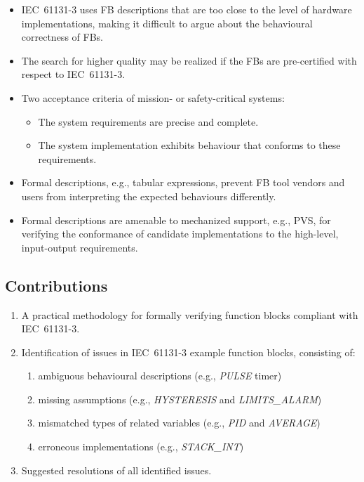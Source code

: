 \documentclass[a0,landscape]{a0poster}
\newcommand{\var}[1]{{\small \textit{#1}}}
\begin{document}
\begin{multicols}{4}
\begin{itemize}
\item IEC~61131-3 uses FB descriptions that are too close to the level of hardware implementations, making it difficult to argue about the behavioural correctness of FBs.
\item The search for higher quality may be realized if the FBs are pre-certified with respect to IEC~61131-3. 
\item Two acceptance criteria of mission- or safety-critical systems:
\begin{itemize}
\item The system requirements are precise and complete.
\item The system implementation exhibits behaviour that conforms to these requirements.
\end{itemize}
\item Formal descriptions, e.g., tabular expressions, prevent FB tool vendors and users from interpreting the expected behaviours differently. 
\item Formal descriptions are amenable to mechanized support, e.g., PVS, for verifying the conformance of candidate implementations to the high-level, input-output requirements.
\end{itemize}


{ \color{BrickRed}
\subsection*{Contributions}

\begin{enumerate}
\item A practical methodology for formally verifying function blocks compliant with IEC~61131-3.
\item Identification of issues in IEC~61131-3 example function blocks, consisting of: 
\begin{enumerate}
\item ambiguous behavioural descriptions (e.g., \var{PULSE} timer)
\item missing assumptions (e.g., \var{HYSTERESIS} and \var{LIMITS\_ALARM})
\item mismatched types of related variables (e.g., \var{PID} and \var{AVERAGE})
\item erroneous implementations (e.g., \var{STACK\_INT})
\end{enumerate}
\item Suggested resolutions of all identified issues.
\end{enumerate}
}


\end{multicols}
\end{document}

